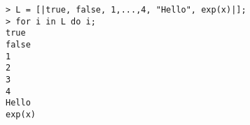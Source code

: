 \begin{center}\begin{minipage}{15cm}\begin{Verbatim}[frame=single]
> L = [|true, false, 1,...,4, "Hello", exp(x)|];
> for i in L do i;
true
false
1
2
3
4
Hello
exp(x)
\end{Verbatim}
\end{minipage}\end{center}
